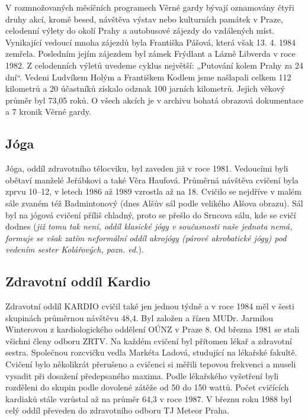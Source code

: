 V rozmnožovaných měsíčních programech Věrné gardy bývají oznamovány
čtyři druhy akcí, kromě besed, návštěva výstav nebo kulturních památek v
Praze, celodenní výlety do okolí Prahy a autobusové zájezdy do
vzdálených míst. Vynikající vedoucí mnoha zájezdů byla Františka Pášová,
která však 13. 4. 1984 zemřela. Posledním jejím zájezdem byl zámek
Frýdlant a Lázně Libverda v roce 1982. Z celodenních výletů uvedeme
cyklus největší: „Putování kolem Prahy za 24 dní``. Vedeni Ludvíkem
Holým a Františkem Kodlem jsme našlapali celkem 112 kilometrů a 20
účastníků získalo odznak 100 jarních kilometrů. Jejich věkový průměr byl
73,05 roků. O všech akcích je v archivu bohatá obrazová dokumentace a 7
kronik Věrné gardy.

\subsection{Jóga}\label{juxf3ga}

Jóga, oddíl zdravotního tělocviku, byl zaveden již v roce 1981.
Vedoucími byli obětaví manželé Jeřábkovi a také Věra Haufová. Průměrná
návštěva cvičení byla zprvu 10--12, v letech 1986 až 1989 vzrostla až na
18. Cvičilo se nejdříve v malém sále zvaném též Badmintonový (dnes Alšův
sál podle velikého Alšova obrazu). Sál byl na jógová cvičení příliš
chladný, proto se přešlo do Srncova sálu, kde se cvičí dodnes (\emph{již
tomu tak není, oddíl klasické jógy v současnosti naše jednota nemá,
formuje se však zatím neformální oddíl akrojógy (párové akrobatické
jógy) pod vedením sester Kolářových, pozn. ed.}).

\subsection{Zdravotní oddíl Kardio}\label{zdravotnuxed-odduxedl-kardio}

Zdravotní oddíl KARDIO cvičil také jen jednou týdně a v roce 1984 měl v
šesti skupinách průměrnou návštěvu 48,4. Byl založen a řízen MUDr.
Jarmilou Winterovou z kardiologického oddělení OÚNZ v Praze 8. Od března
1981 se stali všichni členy odboru ZRTV. Na každém cvičení byl přítomen
lékař a zdravotní sestra. Společnou rozcvičku vedla Markéta Ladová,
studující na lékařské fakultě. Cvičení bylo několikrát přerušeno a
cvičenci si měřili tepovou frekvenci a museli vysadit při dosažení
předepsaného maxima. Podle lékařského vyšetření byli rozděleni do skupin
podle dovolené zátěže od 50 do 150 wattů. Počet cvičících kardiaků stále
vzrůstal až na průměr 64,3 v roce 1987. V březnu roku 1988 byl celý
oddíl převeden do zdravotního odboru TJ Meteor Praha.


